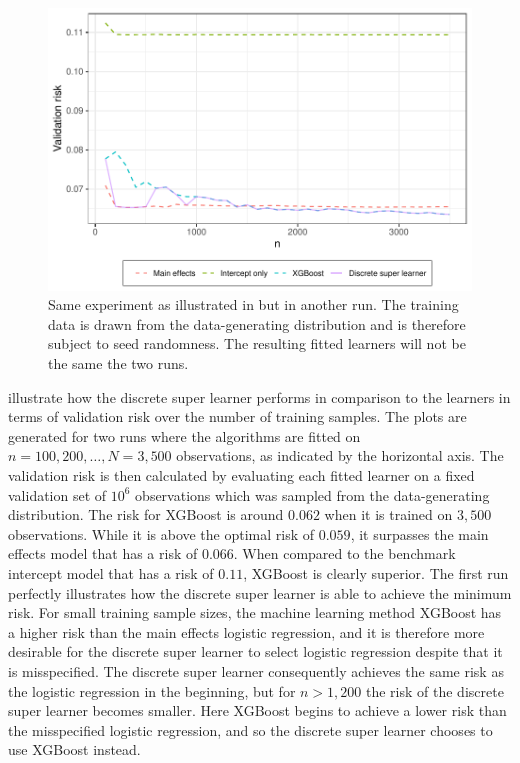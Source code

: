 \documentclass[./main.tex]{subfiles}
\begin{document}
\begin{figure}[H]
    \centering
    \includegraphics[width=\textwidth]{figures/losses_s23.pdf}
    \caption{Same experiment as illustrated in  but in another run. The training data is drawn from the data-generating distribution and is therefore subject to seed randomness. The resulting fitted learners will not be the same the two runs.}
    \label{fig:loss_jumps}
\end{figure}
 illustrate how the discrete super learner performs in comparison to the learners in terms of validation risk over the number of training samples. The plots are generated for two runs where the algorithms are fitted on $ n = 100, 200, \dots , N = 3,500 $ observations, as indicated by the horizontal axis. The validation risk is then calculated by evaluating each fitted learner on a fixed validation set of $ 10^{6} $ observations which was sampled from the data-generating distribution.  
The risk for XGBoost is around $ 0.062 $ when it is trained on $ 3,500 $ observations. While it is above the optimal risk of $ 0.059 $, it surpasses the main effects model that has a risk of $ 0.066 $. When compared to the benchmark intercept model that has a risk of $ 0.11 $, XGBoost is clearly superior. 
The first run perfectly illustrates how the discrete super learner is able to achieve the minimum risk. For small training sample sizes, the machine learning method XGBoost has a higher risk than the main effects logistic regression, and it is therefore more desirable for the discrete super learner to select logistic regression despite that it is misspecified. The discrete super learner consequently achieves the same risk as the logistic regression in the beginning, but for $ n > 1,200 $ the risk of the discrete super learner becomes smaller. Here XGBoost begins to achieve a lower risk than the misspecified logistic regression, and so the discrete super learner chooses to use XGBoost instead. 
\end{document}
